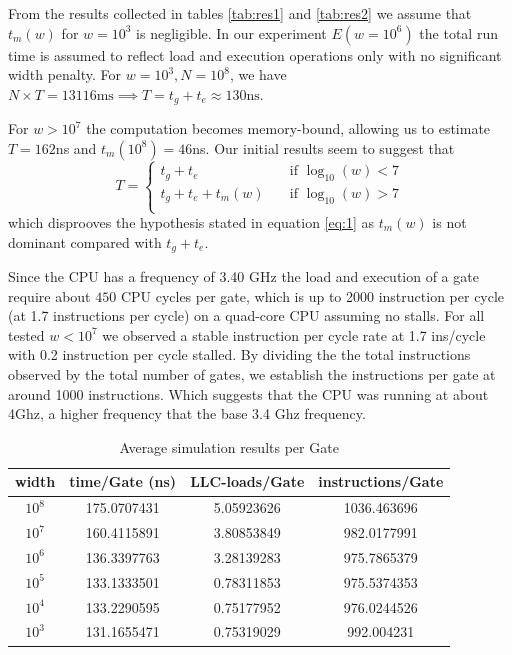 \par
From the results collected in tables \ref{tab:res1} and \ref{tab:res2} we
assume that $t_m(w)$ for $w = 10^3$ is negligible. In our experiment
$E(w = 10^6)$ the total run time is assumed to reflect load and execution operations
only with no significant width penalty. For $w = 10^3, N=10^8$, we have
$N \times T = 13116 \text{ms} \implies T  = t_g + t_e \approx 130 \text{ns}$.
\par
For $ w > 10^7$ the computation becomes memory-bound, allowing us to
estimate $T = 162$ns and $t_m(10^8) = 46$ns.
Our initial results seem to suggest that
\[ T =
  \begin{cases}
    t_g + t_e       & \quad \text{if } \log_{10}(w) < 7\\
    t_g + t_e  + t_m(w) & \quad \text{if } \log_{10}(w) > 7\\
  \end{cases}
\]
which disprooves the hypothesis stated in equation \ref{eq:1} as $t_m(w)$ is not
dominant compared with $t_g + t_e$.
\par
Since the CPU has a frequency of 3.40 GHz the load and execution of a gate require
about $450$ CPU cycles per gate,
which is up to 2000 instruction per cycle (at 1.7 instructions per cycle) on a
quad-core CPU assuming no stalls. For all tested $w < 10^7$ we observed a stable
instruction per cycle rate at 1.7 ins/cycle with 0.2 instruction per cycle stalled.
By dividing the the total instructions observed by the total number of gates, we establish
the instructions per gate at around 1000 instructions. Which suggests that
the CPU was running at about 4Ghz, a higher frequency that the base 3.4 Ghz frequency.
\par
\begin{table}[h!]
\centering
\caption{Average simulation results per Gate}
\label{tab:fig3}
\begin{tabular}{|c|c|c|c|}
\hline
width  & time/Gate (ns) & LLC-loads/Gate & instructions/Gate \\ \hline
$10^8$ & 175.0707431    & 5.05923626     & 1036.463696       \\ \hline
$10^7$ & 160.4115891    & 3.80853849     & 982.0177991       \\ \hline
$10^6$ & 136.3397763    & 3.28139283     & 975.7865379       \\ \hline
$10^5$ & 133.1333501    & 0.78311853     & 975.5374353       \\ \hline
$10^4$ & 133.2290595    & 0.75177952     & 976.0244526       \\ \hline
$10^3$ & 131.1655471    & 0.75319029     & 992.004231        \\ \hline
\end{tabular}
\end{table}
